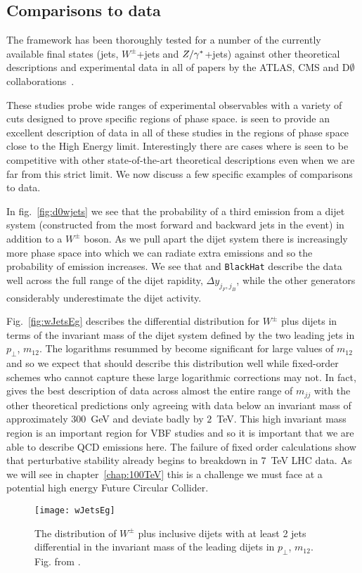 	\subsection{Comparisons to data}

		The \hej framework has been thoroughly tested for a number of the currently available final states (jets,
		$W^\pm$+jets and $Z/\gamma^*$+jets) against other theoretical descriptions and experimental data in all of
		papers by the ATLAS, CMS and D$\emptyset$ collaborations~\cite{Aad:2011jz,Aad:2014pua,Aad:2014qxa,Aad:2014rta,
		Chatrchyan:2012gwa,Abazov:2013gpa,ZPaper}.

		These studies probe wide ranges of experimental observables with a variety of cuts designed to prove
		specific regions of phase space. \hej is seen to provide an excellent description of data in all of these
		studies in the regions of phase space close to the High Energy limit.  Interestingly there are cases where
		\HEJ is seen to be competitive with other state-of-the-art theoretical descriptions even when we are far from
		this strict limit. We now discuss a few specific examples of comparisons to data.

		In fig.~\eqref{fig:d0wjets} we see that the probability of a third emission from a dijet system (constructed
		from the most forward and backward jets in the event) in addition to a $W^\pm$ boson.  As we pull apart the
		dijet system there is increasingly more phase space into which we can radiate extra emissions and so the
		probability of emission increases.  We see that \HEJ and \texttt{BlackHat} describe the data well across
		the full range of the dijet rapidity, $\Delta y_{j_F, j_B}$, while the other generators considerably
		underestimate the dijet activity.

		Fig.~\eqref{fig:wJetsEg} describes the differential distribution for $W^\pm$ plus dijets in terms of the
		invariant mass of the dijet system defined by the two leading jets in $p_\perp$, $m_{12}$.  The logarithms
		resummed by \hej become significant for large values of $m_{12}$ and so we expect that \HEJ should
		describe this distribution well while fixed-order schemes who cannot capture these large logarithmic
		corrections may not. In fact, \HEJ gives the best description of data across almost the entire range of $m_{jj}$
		with the other theoretical predictions only agreeing with data below an invariant mass of approximately $300$~GeV
		and deviate badly by $2$~TeV.  This high invariant mass region is an important region for VBF studies and so it
		is important that we are able to describe QCD emissions here.  The failure of fixed order calculations show that
		perturbative stability already begins to breakdown in $7$~TeV LHC data.  As we will see in chapter~\ref{chap:100TeV}
		this is a challenge we must face at a potential high energy Future Circular Collider.

		\begin{figure}[hbt]
			\centering
			\texttt{[image: wJetsEg]}
			\caption{The distribution of $W^\pm$ plus inclusive dijets with at least
			2 jets differential in the invariant mass of the leading dijets in $p_\perp$, $m_{12}$.
			Fig. from \cite{Aad:2014qxa}.}
			\label{fig:wJetsEg}
		\end{figure}

